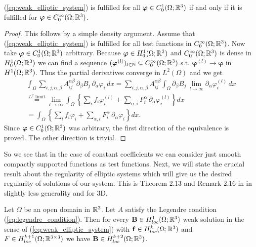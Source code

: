 \documentclass[../master_thesis.tex]{subfiles}
\begin{document}
\begin{proposition}\label{prop:weak_solution_smooth_test_functions}
    (\ref{eq:weak_elliptic_system}) is fulfilled for all 
    $\bm{\varphi} \in C^1_0(\Omega;\mathbb{R}^3)$ if and only if it is fulfilled 
    for $\bm{\varphi} \in C^\infty_0(\Omega;\mathbb{R}^3)$.
\end{proposition}
\begin{proof}
    This follows by a simple density argument. Assume that 
    (\ref{eq:weak_elliptic_system}) is fulfilled for all test functions in 
    $C^\infty_0(\Omega;\mathbb{R}^3)$. Now take $\bm{\varphi} \in C^1_0(\Omega;\mathbb{R}^3)$
    arbitrary. Because $\bm{\varphi} \in H_0^1(\Omega;\mathbb{R}^3)$ and 
    $C^\infty_0(\Omega;\mathbb{R}^3)$ is dense in $H_0^1(\Omega;\mathbb{R}^3)$ we can find 
    a sequence $(\bm{\varphi}^{(l)})_{l \in \mathbb{N}} \subseteq 
    C^\infty_0(\Omega;\mathbb{R}^3)$ s.t. $\bm{\varphi}^{(l)} \rightarrow \bm{\varphi}$
    in $H^1(\Omega;\mathbb{R}^3)$. Thus the partial derivatives converge in $L^2(\Omega)$
    and we get
    \begin{align*}
        &\int_\Omega \sum\limits_{i,j,\alpha,\beta} 
            A_{ij}^{\alpha \beta}\, \partial_\beta B_j\, \partial_\alpha \varphi_i
            \,dx
        = \sum\limits_{i,j,\alpha,\beta} A_{ij}^{\alpha \beta}
            \int_\Omega \partial_\beta B_j \, \lim\limits_{l\rightarrow \infty} 
            \partial_\alpha \varphi_i^{(l)}\, dx
        \\ &\stackrel{\text{$L^2$ limit}}{=} 
            \lim\limits_{l\rightarrow \infty} 
            \int_\Omega \left\{ \sum\limits_i f_i \varphi^{(l)}_i + 
            \sum\limits_{\alpha,i} F_i^\alpha \, \partial_\alpha \varphi^{(l)}_i 
            \right\} dx
        \\ &= \int_\Omega \left\{ \sum\limits_i f_i \varphi_i + 
            \sum\limits_{\alpha,i} F_i^\alpha \, \partial_\alpha \varphi_i 
            \right\} dx.
    \end{align*}
    Since $\bm{\varphi} \in C_0^1(\Omega;\mathbb{R}^3)$ was arbitrary, the first 
    direction of the equivalence is proved. The other direction is trivial.
\end{proof}
So we see that in the case of constant coefficients we can consider 
just smooth compactly supported functions as test functions.
Next, we will state the crucial result about the regularity of elliptic systems
which will give us the desired regularity of solutions of our system. This is Theorem 2.13 and Remark 2.16 
in \cite{lectures_on_elliptic_pdes} in slightly less generality and for 3D.
\begin{theorem}\label{thm:regularity_elliptic_systems}
    Let $\Omega$ be an open domain in $\mathbb{R}^3$. Let $A$ 
    satisfy the Legendre condition (\ref{eq:legendre_condition}). Then for every 
    $\mathbf{B} \in H^1_{loc}(\Omega;\mathbb{R}^3)$ weak solution in the sense of
    (\ref{eq:weak_elliptic_system}) with $\mathbf{f} \in H^k_{loc}(\Omega;\mathbb{R}^3)$ and 
    $F \in H^{k+1}_{loc}(\Omega;\mathbb{R}^{3\times 3})$ 
    we have $\mathbf{B} \in H^{k+2}_{loc}(\Omega;\mathbb{R}^3)$. 
\end{theorem}
\end{document}
